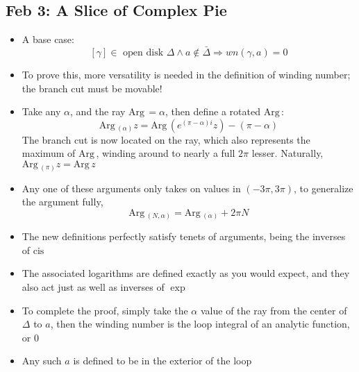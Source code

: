 \documentclass[10pt, oneside]{article}
\newcommand{\cis}{\text{cis} \,}
\newcommand{\Arg}{\text{Arg} \,}
\begin{document}
\subsection{Feb 3: A Slice of Complex Pie}
\begin{itemize}
    \item A base case:
        \[[\gamma] \in \text{ open disk }\Delta \land a \notin \bar{\Delta} \Rightarrow wn(\gamma,a) = 0\]
    \item To prove this, more versatility is needed in the definition of winding number; the branch cut must be movable!
    \item Take any $\alpha$, and the ray $\Arg = \alpha$, then define a rotated $\Arg$:
        \[\Arg_{(\alpha)} z = \Arg(e^{(\pi - \alpha)i} z) - (\pi - \alpha)\]
        The branch cut is now located on the ray, which also represents the maximum of $\Arg$, winding around to nearly a full $2\pi$ lesser. Naturally, $\Arg_{(\pi)} z = \Arg z$
    \item Any one of these arguments only takes on values in $(-3\pi,3\pi)$, to generalize the argument fully,
        \[\Arg_{(N,\alpha)} = \Arg_{(\alpha)} + 2\pi N\]
    \item The new definitions perfectly satisfy tenets of arguments, being the inverses of $\cis$
    \item The associated logarithms are defined exactly as you would expect, and they also act just as well as inverses of $\exp$
    \item To complete the proof, simply take the $\alpha$ value of the ray from the center of $\Delta$ to $a$, then the winding number is the loop integral of an analytic function, or $0$
    \item Any such $a$ is defined to be in the exterior of the loop
\end{itemize}
\end{document}
